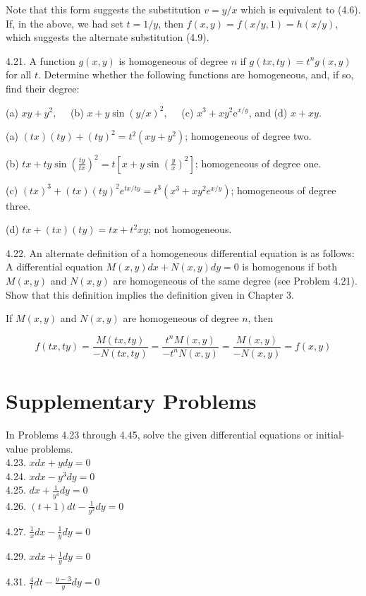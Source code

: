 \documentclass[10pt]{article}
\begin{document}
Note that this form suggests the substitution $v=y / x$ which is equivalent to (4.6). If, in the above, we had set $t=1 / y$, then $f(x, y)=f(x / y, 1)=h(x / y)$, which suggests the alternate substitution (4.9).

4.21. A function $g(x, y)$ is homogeneous of degree $n$ if $g(t x, t y)=t^{n} g(x, y)$ for all $t$. Determine whether the following functions are homogeneous, and, if so, find their degree:

(a) $x y+y^{2}, \quad$ (b) $x+y \sin (y / x)^{2}, \quad$ (c) $x^{3}+x y^{2} \mathrm{e}^{x / y}$, and (d) $x+x y$.

(a) $(t x)(t y)+(t y)^{2}=t^{2}\left(x y+y^{2}\right)$; homogeneous of degree two.

(b) $t x+t y \sin \left(\frac{t y}{t x}\right)^{2}=t\left[x+y \sin \left(\frac{y}{x}\right)^{2}\right]$; homogeneous of degree one.

(c) $(t x)^{3}+(t x)(t y)^{2} e^{t x / t y}=t^{3}\left(x^{3}+x y^{2} e^{x / y}\right)$; homogeneous of degree three.

(d) $t x+(t x)(t y)=t x+t^{2} x y$; not homogeneous.

4.22. An alternate definition of a homogeneous differential equation is as follows: A differential equation $M(x, y) d x+N(x, y) d y=0$ is homogenous if both $M(x, y)$ and $N(x, y)$ are homogeneous of the same degree (see Problem 4.21). Show that this definition implies the definition given in Chapter 3.

If $M(x, y)$ and $N(x, y)$ are homogeneous of degree $n$, then

$$
f(t x, t y)=\frac{M(t x, t y)}{-N(t x, t y)}=\frac{t^{n} M(x, y)}{-t^{n} N(x, y)}=\frac{M(x, y)}{-N(x, y)}=f(x, y)
$$

\section*{Supplementary Problems}
In Problems 4.23 through 4.45, solve the given differential equations or initial-value problems.\\
4.23. $x d x+y d y=0$\\
4.24. $x d x-y^{3} d y=0$\\
4.25. $d x+\frac{1}{y^{4}} d y=0$\\
4.26. $(t+1) d t-\frac{1}{y^{2}} d y=0$

4.27. $\frac{1}{x} d x-\frac{1}{y} d y=0$

4.29. $x d x+\frac{1}{y} d y=0$

4.31. $\frac{4}{t} d t-\frac{y-3}{y} d y=0$
\end{document}
